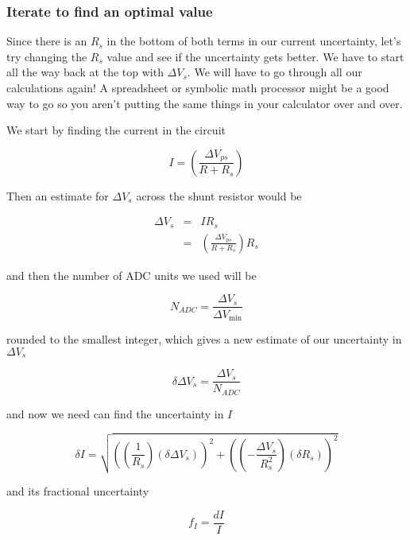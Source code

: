 \subsubsection{Iterate to find an optimal value}

Since there is an $R_{s}$ in the bottom of both terms in our current uncertainty, let's try changing the $R_{s}$ value and see if the uncertainty gets better. We have to start all the way back at the top with $\Delta V_{s}. $ We will have to go through all our calculations again! A
spreadsheet or symbolic math processor might be a good way to go so you aren't putting the same things in your calculator over and over.

We start by finding the current in the circuit

\begin{equation*}
	I=\left( \frac{\Delta V_{ps}}{R+R_{s}}\right)
\end{equation*}

\noindent Then an estimate for $\Delta V_{s}$ across the shunt resistor would be

\begin{eqnarray*}
	\Delta V_{s} &=&IR_{s} \\ &=&\left( \frac{\Delta V_{ps}}{R+R_{s}}\right) R_{s}
\end{eqnarray*}

\noindent and then the number of ADC units we used will be 

\begin{equation*}
	N_{ADC}=\frac{\Delta V_{s}}{\Delta V_{\min }}
\end{equation*}

\noindent rounded to the smallest integer, which gives a new estimate of our uncertainty in $\Delta V_{s}$ 

\begin{equation*}
	\delta \Delta V_{s}=\frac{\Delta V_{s}}{N_{ADC}}
\end{equation*}

\noindent and now we need can find the uncertainty in $I$

\begin{equation*}
	\delta I=\sqrt{\left( \left( \frac{1}{R_{s}}\right) \left( \delta \Delta V_{s}\right) \right) ^{2}+\left( \left( -\frac{\Delta V_{s}}{R_{s}^{2}} \right) \left( \delta R_{s}\right) \right) ^{2}}
\end{equation*}

\noindent and its fractional uncertainty

\begin{equation*}
	f_{I}=\frac{dI}{I}
\end{equation*}

